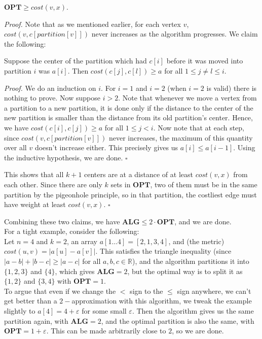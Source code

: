 \documentclass[a4paper]{article}
\newenvironment{proof}{\begin{breakbox}\textit{Proof.}}{\hfill$\square$\end{breakbox}}
\newcommand{\nl}{\vspace{0.2cm}\\}
\newcommand{\eps}{\varepsilon}
\newcommand{\R}{\mathbb{R}}
\newcommand{\OPT}{\mathbf{OPT}}
\newcommand{\ALG}{\mathbf{ALG}}
\begin{document}
\begin{claim}
    $\OPT \ge cost(v, x)$.
\end{claim}
\begin{proof}
    Note that as we mentioned earlier, for each vertex $v$, $cost(v, c[partition[v]])$ never increases as the algorithm progresses. We claim the following:\nl
    \begin{claim}
        Suppose the center of the partition which had $c[i]$ before it was moved into partition $i$ was $a[i]$. Then $cost(c[j], c[l]) \ge a$ for all $1 \le j \ne l \le i$.
    \end{claim}
    \begin{proof}
        We do an induction on $i$. For $i = 1$ and $i = 2$ (when $i = 2$ is valid) there is nothing to prove. Now suppose $i > 2$.
        Note that whenever we move a vertex from a partition to a new partition, it is done only if the distance to the center of the new partition is smaller than the distance from its old
        partition's center. Hence, we have $cost(c[i], c[j]) \ge a$ for all $1 \le j < i$. Now note that at each step, since $cost(v, c[partition[v]])$ never increases, the maximum of this quantity
        over all $v$ doesn't increase either. This precisely gives us $a[i] \le a[i - 1]$. Using the inductive hypothesis, we are done.
    \end{proof}
    This shows that all $k + 1$ centers are at a distance of at least $cost(v, x)$ from each other. Since there are only $k$ sets in $\OPT$, two of them must be in the same partition by the
    pigeonhole principle, so in that partition, the costliest edge must have weight at least $cost(v, x)$.
\end{proof}
Combining these two claims, we have $\ALG \le 2 \cdot \OPT$, and we are done.\nl
For a tight example, consider the following:\nl
Let $n = 4$ and $k = 2$, an array $a[1\ldots 4] = [2, 1, 3, 4]$, and (the metric) $cost(u, v) = |a[u] - a[v]|$. This satisfies the triangle inequality (since $|a - b| + |b - c| \ge |a - c|$ for all $a, b,
c \in \R$), and the algorithm partitions it into $\{1, 2, 3\}$ and $\{4\}$, which gives $\ALG = 2$, but the optimal way is to split it as $\{1, 2\}$ and $\{3, 4\}$ with $\OPT = 1$.\nl
To argue that even if we change the $<$ sign to the $\le$ sign anywhere, we can't get better than a $2-$approximation with this algorithm, we tweak the example slightly to $a[4] = 4 + \eps$ for some
small $\eps$. Then the algorithm gives us the same partition again, with $\ALG = 2$, and the optimal partition is also the same, with $\OPT = 1 + \eps$. This can be made arbitrarily close to
$2$, so we are done.
\end{document}
